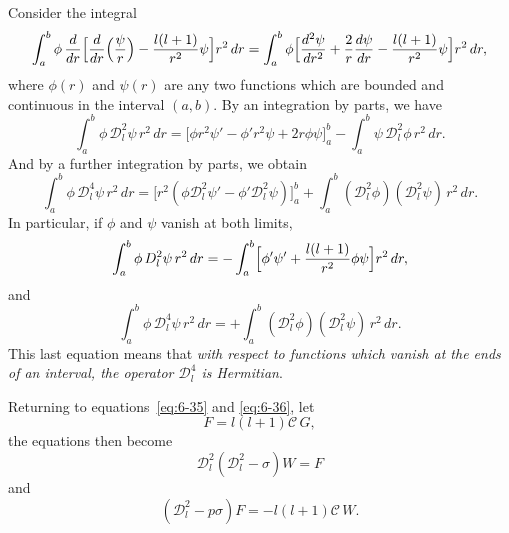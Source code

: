 Consider the integral
\begin{equation}\label{eq:6-62}
\int_a^b \phi\,\frac{d}{dr}\Bigl[\frac{d}{dr}\Bigl(\frac{\psi}{r}\Bigr) - \frac{l(l+1)}{r^2}\psi\Bigr]r^2\,dr =
\int_a^b \phi\Bigl[\frac{d^2\psi}{dr^2} + \frac{2}{r}\frac{d\psi}{dr} - \frac{l(l+1)}{r^2}\psi\Bigr]r^2\,dr,
\end{equation}
where $\phi(r)$ and $\psi(r)$ are any two functions which are bounded and con\-tinuous in the interval $(a,b)$. By an integration by parts, we have
\begin{equation}\label{eq:6-63}
\int_a^b \phi\,\mathscr{D}_l^2\psi\,r^2\,dr = \bigl[\phi r^2\psi' - \phi'r^2\psi + 2r\phi\psi\bigr]_a^b - \int_a^b \psi\,\mathscr{D}_l^2\phi\,r^2\,dr.
\end{equation}
And by a further integration by parts, we obtain
\begin{equation}\label{eq:6-64}
\int_a^b \phi\,\mathscr{D}_l^4\psi\,r^2\,dr = \bigl[r^2(\phi\mathscr{D}_l^2\psi' - \phi'\mathscr{D}_l^2\psi)\bigr]_a^b + \int_a^b (\mathscr{D}_l^2\phi)(\mathscr{D}_l^2\psi)\,r^2\,dr.
\end{equation}
In particular, if $\phi$ and $\psi$ vanish at both limits,
\begin{equation}\label{eq:6-65}
\int_a^b \phi\,\mathscr{D}_l^2\psi\,r^2\,dr = -\int_a^b \Bigl[\phi'\psi' + \frac{l(l+1)}{r^2}\phi\psi\Bigr]r^2\,dr,
\end{equation}
and
\begin{equation}\label{eq:6-66}
\int_a^b \phi\,\mathscr{D}_l^4\psi\,r^2\,dr = +\int_a^b (\mathscr{D}_l^2\phi)(\mathscr{D}_l^2\psi)\,r^2\,dr.
\end{equation}
This last equation means that \emph{with respect to functions which vanish at the
ends of an interval, the operator $\mathscr{D}_l^4$ is Hermitian}.

Returning to equations~\eqref{eq:6-35} and \eqref{eq:6-36}, let
\begin{equation}\label{eq:6-67}
F = l(l+1)\mathcal{C}\,G,
\end{equation}
the equations then become
\begin{equation}\label{eq:6-68}
\mathscr{D}_l^2(\mathscr{D}_l^2 - \sigma)W = F
\end{equation}
and
\begin{equation}\label{eq:6-69}
(\mathscr{D}_l^2 - p\sigma)F = -l(l+1)\mathcal{C}\,W.
\end{equation}

